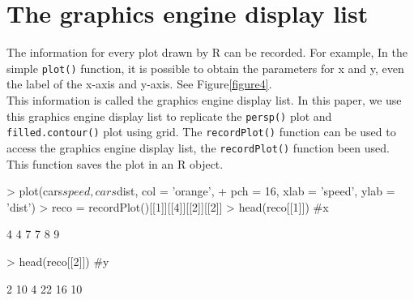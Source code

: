 \documentclass[paper=a4, fontsize=11pt]{report}
\begin{document}
\chapter{The graphics engine display list}
The information for every plot drawn by R can be recorded. For example, In the simple \texttt{plot()} function, it is possible to obtain the parameters for x and y, even the label of the x-axis and y-axis. See Figure\ref{figure4}.\\

This information is called the graphics engine display list. In this paper, we use this graphics engine display list to replicate the \texttt{persp()} plot and \texttt{filled.contour()} plot using grid. The \texttt{recordPlot()} function can be used to access the graphics engine display list, the \texttt{recordPlot()} function been used. This function saves the plot in an R object. 

\begin{Schunk}
\begin{Sinput}
> plot(cars$speed, cars$dist, col = 'orange', 
+       pch = 16, xlab = 'speed', ylab = 'dist')
> reco = recordPlot()[[1]][[4]][[2]][[2]]
> head(reco[[1]]) #x
\end{Sinput}
\begin{Soutput}
[1] 4 4 7 7 8 9
\end{Soutput}
\begin{Sinput}
> head(reco[[2]]) #y
\end{Sinput}
\begin{Soutput}
[1]  2 10  4 22 16 10
\end{Soutput}
\end{Schunk}
\end{document}
